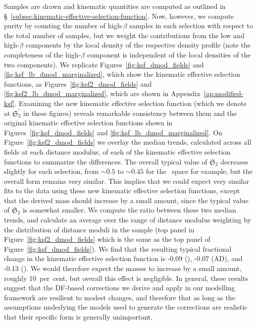 Samples are drawn and kinematic quantities are computed as outlined in \S~\ref{subsec:kinematic-effective-selection-function}. Now, however, we compute purity by counting the number of high-$\beta$ samples in each selection with respect to the total number of samples, but we weight the contributions from the low and high-$\beta$ components by the local density of the respective density profile (note the completeness of the high-$\beta$ component is independent of the local densities of the two components). We replicate Figures~\ref{fig:ksf_dmod_fields} and \ref{fig:ksf_lb_dmod_marginalized}, which show the kinematic effective selection functions, as Figures~\ref{fig:ksf2_dmod_fields} and \ref{fig:ksf2_lb_dmod_marginalized}, which are shown in Appendix~\ref{ap:modified-ksf}. Examining the new kinematic effective selection function (which we denote at $\mathfrak{S}_{2}^{\prime}$ in these figures) reveals remarkable consistency between them and the original kinematic effective selection functions shown in Figures~\ref{fig:ksf_dmod_fields} and \ref{fig:ksf_lb_dmod_marginalized}. On Figure~\ref{fig:ksf2_dmod_fields} we overlay the median trends, calculated across all fields at each distance modulus, of each of the kinematic effective selection functions to summarize the differences. The overall typical value of $\mathfrak{S}_{2}$ decreases slightly for each selection, from $\sim 0.5$ to $\sim 0.45$ for the \eLz\ space for example, but the overall form remains very similar. This implies that we could expect very similar fits to the data using these new kinematic effective selection functions, except that the derived mass should increase by a small amount, since the typical value of $\mathfrak{S}_{2}$ is somewhat smaller. We compute the ratio between these two median trends, and calculate an average over the range of distance modulus weighting by the distribution of distance moduli in the sample (top panel in Figure~\ref{fig:ksf2_dmod_fields} which is the same as the top panel of Figure~\ref{fig:ksf_dmod_fields}). We find that the resulting typical fractional change in the kinematic effective selection function is -0.09 (\eLz), -0.07 (AD), and -0.13 (\JRLz). We would therefore expect the masses to increase by a small amount, roughly 10~per~cent, but overall this effect is negligible. In general, these results suggest that the DF-based corrections we derive and apply in our modelling framework are resilient to modest changes, and therefore that as long as the assumptions underlying the models used to generate the corrections are realistic that their specific form is generally unimportant.

